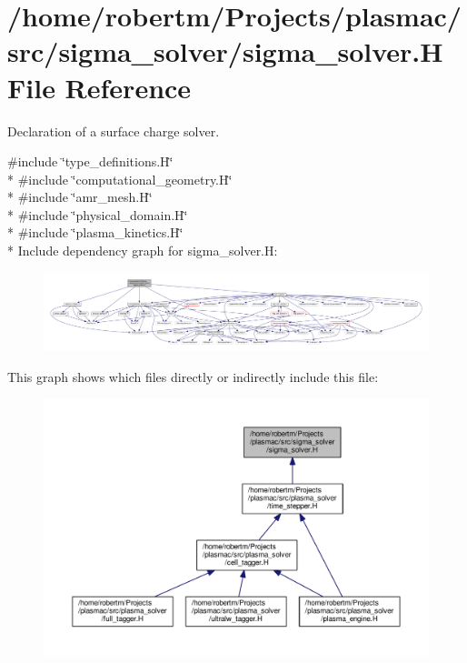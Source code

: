 \hypertarget{sigma__solver_8H}{}\section{/home/robertm/\+Projects/plasmac/src/sigma\+\_\+solver/sigma\+\_\+solver.H File Reference}
\label{sigma__solver_8H}


Declaration of a surface charge solver.  


{\ttfamily \#include \char`\"{}type\+\_\+definitions.\+H\char`\"{}}\\*
{\ttfamily \#include \char`\"{}computational\+\_\+geometry.\+H\char`\"{}}\\*
{\ttfamily \#include \char`\"{}amr\+\_\+mesh.\+H\char`\"{}}\\*
{\ttfamily \#include \char`\"{}physical\+\_\+domain.\+H\char`\"{}}\\*
{\ttfamily \#include \char`\"{}plasma\+\_\+kinetics.\+H\char`\"{}}\\*
Include dependency graph for sigma\+\_\+solver.\+H\+:\nopagebreak
\begin{figure}[H]
\begin{center}
\leavevmode
\includegraphics[width=350pt]{sigma__solver_8H__incl}
\end{center}
\end{figure}
This graph shows which files directly or indirectly include this file\+:\nopagebreak
\begin{figure}[H]
\begin{center}
\leavevmode
\includegraphics[width=350pt]{sigma__solver_8H__dep__incl}
\end{center}
\end{figure}
